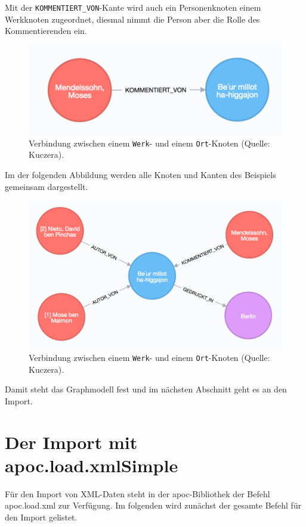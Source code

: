 \documentclass[ngerman,]{scrreprt}
\begin{document}
Mit der \texttt{KOMMENTIERT\_VON}-Kante wird auch ein Personenknoten einem Werkknoten zugeordnet, diesmal nimmt die Person aber die Rolle des Kommentierenden ein.

\begin{figure}
\centering
\includegraphics{Bilder/Werk-Kommentator.png}
\caption{Verbindung zwischen einem \texttt{Werk}- und einem \texttt{Ort}-Knoten (Quelle: Kuczera).}
\end{figure}

Im der folgenden Abbildung werden alle Knoten und Kanten des Beispiels gemeinsam dargestellt.

\begin{figure}
\centering
\includegraphics{Bilder/Werk-gesamt.png}
\caption{Verbindung zwischen einem \texttt{Werk}- und einem \texttt{Ort}-Knoten (Quelle: Kuczera).}
\end{figure}

Damit steht das Graphmodell fest und im nächsten Abschnitt geht es an den Import.

\section{Der Import mit apoc.load.xmlSimple}\label{der-import-mit-apoc.load.xmlsimple}

Für den Import von XML-Daten steht in der apoc-Bibliothek der Befehl apoc.load.xml zur Verfügung. Im folgenden wird zunächst der gesamte Befehl für den Import gelistet.
\end{document}
